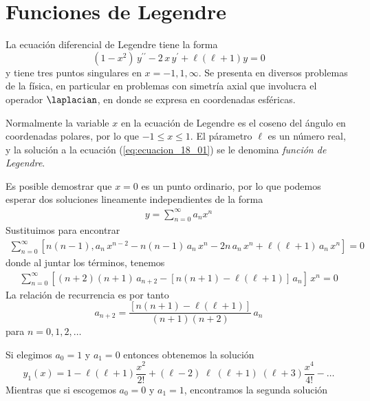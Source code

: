 \section{Funciones de Legendre}
La ecuación diferencial de Legendre tiene la forma
\begin{equation}
(1 - x^{2}) \, y^{\prime \prime} - 2 \, x \, y^{\prime} + \ell (\ell + 1) y = 0
\label{eq:ecuacion_18_01}
 \end{equation}
y tiene tres puntos singulares en $x = -1, 1, \infty$. Se presenta en diversos problemas de la física, en particular en problemas con simetría axial que involucra el operador $\laplacian$, en donde se expresa en coordenadas esféricas.
\par
Normalmente la variable $x$ en la ecuación de Legendre es el coseno del ángulo en coordenadas polares, por lo que $-1 \leq x \leq 1$. El párametro $\ell$ es un número real, y la solución a la ecuación (\ref{eq:ecuacion_18_01}) se le denomina \emph{función de Legendre}.
\par
Es posible demostrar que $x = 0$ es un punto ordinario, por lo que podemos esperar dos soluciones lineamente independientes de la forma
\begin{align*}
y = \sum_{n=0}^{\infty} a_{n} x^{n}
\end{align*}
Sustituimos para encontrar
\begin{align*}
\sum_{n=0}^{\infty} \left[ n (n-1) , a_{n} \, x^{n-2} - n (n-1) \, a_{n} \, x^{n} - 2 n \, a_{n} \, x^{n} + \ell (\ell + 1) \, a_{n}  \, x^{n} \right] = 0 
\end{align*}
donde al juntar los términos, tenemos
\begin{align*}
 \sum_{n=0}^{\infty} \left[ (n+2)(n+1) \, a_{n+2} - [ n(n+1) - \ell (\ell + 1) ] \, a_{n} \right] \,x^{n} = 0
\end{align*}
La relación de recurrencia es por tanto
\begin{equation}
a_{n+2} = \dfrac{[n (n+1) - \ell ( \ell + 1)]}{(n+1)(n+2)} \, a_{n}
\label{eq:ecuacion_18_02}
\end{equation}
para $n = 0, 1, 2, \ldots$
\par
Si elegimos $a_{0} = 1$ y $a_{1} = 0$ entonces obtenemos la solución
\begin{equation}
y_{1}(x) = 1 - \ell (\ell + 1) \dfrac{x^{2}}{2!} + (\ell - 2)\; \ell \; (\ell + 1)\;(\ell + 3) \dfrac{x^{4}}{4!} - \ldots
\label{eq:ecuacion_18_03}
\end{equation}
Mientras que si escogemos $a_{0} = 0$ y $ a_{1} = 1 $, encontramos la segunda solución
